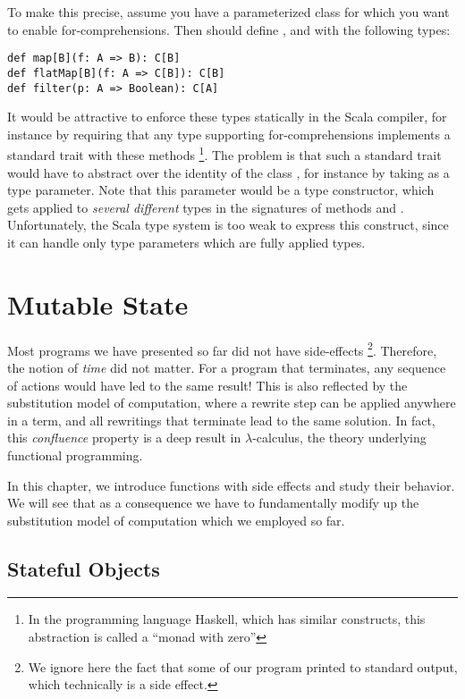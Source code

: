 {To make this precise, assume you have a parameterized class
  for which you want to enable for-comprehensions. Then
  should define ,  and 
 with the following types:
\begin{lstlisting}
def map[B](f: A => B): C[B]
def flatMap[B](f: A => C[B]): C[B]
def filter(p: A => Boolean): C[A]
\end{lstlisting}
It would be attractive to enforce these types statically in the Scala
compiler, for instance by requiring that any type supporting
for-comprehensions implements a standard trait with these methods
\footnote{In the programming language Haskell, which has similar
constructs, this abstraction is called a ``monad with zero''}.  The
problem is that such a standard trait would have to abstract over the
identity of the class , for instance by taking  as a
type parameter.  Note that this parameter would be a type constructor,
which gets applied to {\em several different} types in the signatures of
methods  and . Unfortunately, the Scala type
system is too weak to express this construct, since it can handle only
type parameters which are fully applied types.

\chapter{Mutable State}

Most programs we have presented so far did not have side-effects
\footnote{We ignore here the fact that some of our program printed to
standard output, which technically is a side effect.}.  Therefore, the
notion of {\em time} did not matter.  For a program that terminates,
any sequence of actions would have led to the same result!  This is
also reflected by the substitution model of computation, where a
rewrite step can be applied anywhere in a term, and all rewritings
that terminate lead to the same solution.  In fact, this {\em
confluence} property is a deep result in $\lambda$-calculus, the
theory underlying functional programming. 

In this chapter, we introduce functions with side effects and study
their behavior. We will see that as a consequence we have to
fundamentally modify up the substitution model of computation which we
employed so far.

\section{Stateful Objects}

}
